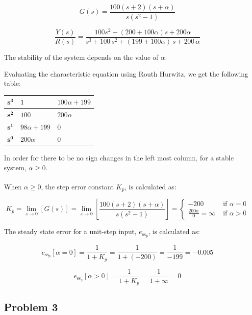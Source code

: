 \documentclass[12pt, letterpaper]{../assignment}
\begin{document}
$$ G(s) = \frac{100(s+2)(s+\alpha)}{s(s^2 -1)} $$

$$ \frac{Y(s)}{R(s)} = \frac{100s^2 + (200 + 100 \alpha)s + 200 \alpha}{s^3+100\,s^2+(199+100 \alpha) \,s+200\,\alpha } $$

The stability of the system depends on the value of $\alpha$.

Evaluating the characteristic equation using Routh Hurwitz, we get the following table:

\begin{center}
    \begin{tabular}{ | m{2em} | m{15em}| m{15em} | } 
      \hline
      $\mathbf{s^3}$ & $1$ & $100 \alpha + 199$ \\ 
      \hline
      $\mathbf{s^2}$ & $100$ & $200 \alpha$ \\ 
      \hline
      $\mathbf{s^1}$ & $98 \alpha + 199$ & 0 \\ 
      \hline
      $\mathbf{s^0}$ & $200 \alpha$ & 0 \\ 
      \hline
    \end{tabular}
\end{center}

In order for there to be no sign changes in the left most column, for a stable system, $\alpha \geq 0$.
\\\\
When $\alpha \geq 0$, the step error constant $K_p$, is calculated as:

$$ K_p = \lim_{s \to 0} \left[ G(s) \right]
       = \lim_{s \to 0} \left[ \frac{100(s+2)(s+\alpha)}{s(s^2 -1)} \right]
       = \left\{\begin{array}{cl} -200 & \text{\ if\ \ }\alpha =0\\ \frac{200 \alpha}{0} = \infty & \text{\ if\ \ }\alpha > 0 \end{array}\right.$$

The steady state error for a unit-step input, ${e_{\text{ss}_\text{p}}}$, is calculated as:

\begin{answer}
$$ {e_{\text{ss}_\text{p}}}[\alpha = 0] = \frac{1}{1 + K_p} = \frac{1}{1 + (-200)} = \frac{1}{-199} = -0.005 $$
\end{answer}

\begin{answer}
$$ {e_{\text{ss}_\text{p}}}[\alpha > 0] = \frac{1}{1 + K_p} = \frac{1}{1 + \infty} = 0 $$
\end{answer}

\subsection*{Problem 3}
\end{document}
